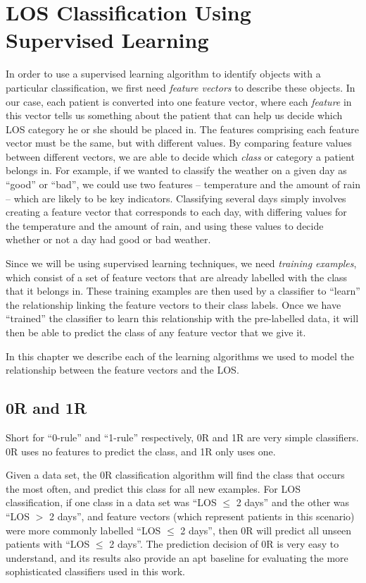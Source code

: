 \chapter{LOS Classification Using Supervised Learning}
  \label{chap:classification}

In order to use a supervised learning algorithm to identify objects with
a particular classification, we first need \textit{feature vectors} to
describe these objects. In our case, each patient is converted into one
feature vector, where each \textit{feature} in this vector tells us
something about the
patient that can help us decide which LOS category he or she should be
placed in. The features comprising each feature vector must be the same,
but with different values. By comparing feature values between different
vectors, we are able to decide which \textit{class} or category a patient
belongs in. For example, if we wanted to classify the weather on a given
day as ``good'' or ``bad'', we could use two features -- temperature and
the amount of rain -- which are likely to be key indicators. Classifying
several days simply involves creating a feature vector that corresponds
to each day, with differing values for the temperature and the amount of
rain, and using these values to decide whether or not a day had good or
bad weather.

Since we will be using supervised learning techniques, we need
\textit{training examples}, which consist of a set of feature vectors
that are already labelled with the class that it belongs in. These
training examples are then used by a classifier to ``learn'' the
relationship linking the feature vectors to their class labels. Once we have
``trained'' the classifier to learn this relationship with the pre-labelled
data, it will then be able to predict the class of any feature vector that we
give it.

In this
chapter we describe each of the learning algorithms we used to model the
relationship between the feature vectors and the LOS.

\section{0R and 1R}
Short for ``0-rule'' and ``1-rule'' respectively, 0R and 1R are
very simple classifiers. 0R uses no features to predict the class, and
1R only uses one.

Given a data set, the 0R classification algorithm will find the class that
occurs the most often, and predict this class for all new examples. For LOS
classification, if one class in a data set was ``LOS $\leq$ 2 days'' and
the other was
``LOS $>$ 2 days'', and feature vectors (which represent patients in this
scenario) were more commonly labelled ``LOS $\leq$ 2 days'', then 0R will
predict all unseen patients with ``LOS $\leq$ 2 days''.
The prediction decision of 0R is very easy to understand,
and its results also provide an apt baseline for evaluating the more
sophisticated classifiers used in this work.

